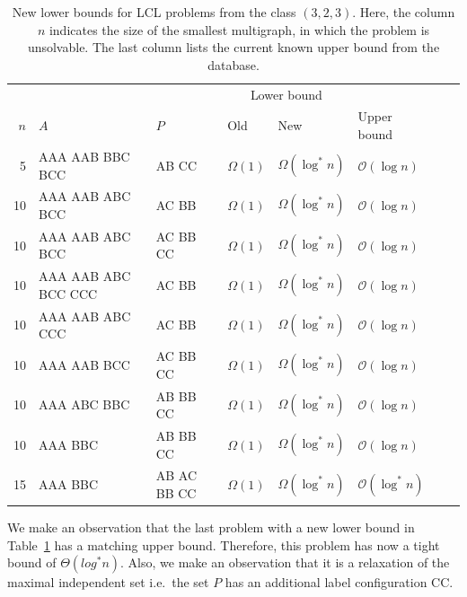 \begin{table}[H]
    \centering
    \begin{adjustbox}{width={\textwidth},keepaspectratio}%
    \begin{tabular}{rlllllll}
        \toprule
        &&& \multicolumn{2}{c}{Lower bound} \\
        \cmidrule{4-5}
        $n$ & $A$ & $P$ & Old & New & Upper bound\\
        \midrule
        5  & AAA AAB BBC BCC     & AB CC       & $\Omega(1)$ & $\Omega(\log^*n)$ & $\mathcal{O}(\log n)$\\
        10 & AAA AAB ABC BCC     & AC BB       & $\Omega(1)$ & $\Omega(\log^*n)$ & $\mathcal{O}(\log n)$\\
        10 & AAA AAB ABC BCC     & AC BB CC    & $\Omega(1)$ & $\Omega(\log^*n)$ & $\mathcal{O}(\log n)$\\
        10 & AAA AAB ABC BCC CCC & AC BB       & $\Omega(1)$ & $\Omega(\log^*n)$ & $\mathcal{O}(\log n)$\\
        10 & AAA AAB ABC CCC     & AC BB       & $\Omega(1)$ & $\Omega(\log^*n)$ & $\mathcal{O}(\log n)$\\
        10 & AAA AAB BCC         & AC BB CC    & $\Omega(1)$ & $\Omega(\log^*n)$ & $\mathcal{O}(\log n)$\\
        10 & AAA ABC BBC         & AB BB CC    & $\Omega(1)$ & $\Omega(\log^*n)$ & $\mathcal{O}(\log n)$\\
        10 & AAA BBC             & AB BB CC    & $\Omega(1)$ & $\Omega(\log^*n)$ & $\mathcal{O}(\log n)$\\
        15 & AAA BBC             & AB AC BB CC & $\Omega(1)$ & $\Omega(\log^*n)$ & $\mathcal{O}(\log^* n)$\\
        \bottomrule
    \end{tabular}
    \end{adjustbox}
    \caption{%
    New lower bounds for LCL problems from the class $(3,2,3)$.
    Here, the column $n$ indicates the size of the smallest multigraph, in which the problem is unsolvable.
    The last column lists the current known upper bound from the database.
    }
    \label{tbl:results:asd2}
\end{table}
We make an observation that the last problem with a new lower bound in Table~\ref{tbl:results:asd2} has a matching upper bound.
Therefore, this problem has now a tight bound of $\Theta(log^* n)$.
Also, we make an observation that it is a relaxation of the maximal independent set i.e.\ the set $P$ has an additional label configuration CC.

